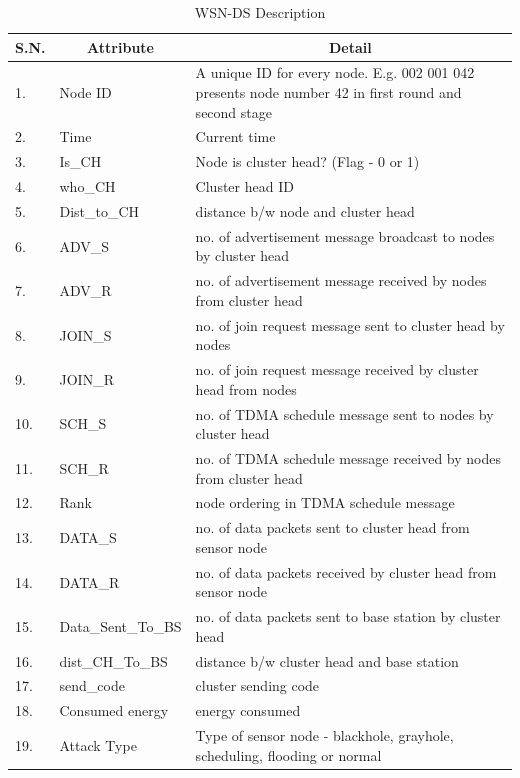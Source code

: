 \begin{longtable}[c]{|p{0.5in}|p{1.5in}|p{3.5in}|}
\caption{WSN-DS Description}
\label{tab:WSNDS}\\
\hline
\multicolumn{1}{|c|}{\textbf{S.N.}} & \multicolumn{1}{c|}{\textbf{Attribute}} & \multicolumn{1}{c|}{\textbf{Detail}} \\ \hline
\endfirsthead
%
\endhead
%
1. & Node ID & A unique ID for every node. E.g. 002 001 042 presents node number 42 in first round and second stage \\ \hline
2. & Time & Current time \\ \hline
3. & Is\_CH & Node is cluster head? (Flag - 0 or 1) \\ \hline
4. & who\_CH & Cluster head ID \\ \hline
5. & Dist\_to\_CH & distance b/w node and cluster head \\ \hline
6. & ADV\_S & no. of advertisement message broadcast to nodes by cluster head \\ \hline
7. & ADV\_R & no. of advertisement message received by nodes from cluster head \\ \hline
8. & JOIN\_S & no. of join request message sent to cluster head by nodes \\ \hline
9. & JOIN\_R & no. of join request message received by cluster head from nodes \\ \hline
10. & SCH\_S & no. of TDMA schedule message sent to nodes by cluster head \\ \hline
11. & SCH\_R & no. of TDMA schedule message received by nodes from cluster head \\ \hline
12. & Rank & node ordering in TDMA schedule message \\ \hline
13. & DATA\_S & no. of data packets sent to cluster head from sensor node \\ \hline
14. & DATA\_R & no. of data packets received by cluster head from sensor node \\ \hline
15. & Data\_Sent\_To\_BS & no. of data packets sent to base station by cluster head \\ \hline
16. & dist\_CH\_To\_BS & distance b/w cluster head and base station \\ \hline
17. & send\_code & cluster sending code \\ \hline
18. & Consumed energy & energy consumed \\ \hline
19. & Attack Type & Type of sensor node - blackhole, grayhole, scheduling, flooding or normal \\ \hline
\end{longtable}




